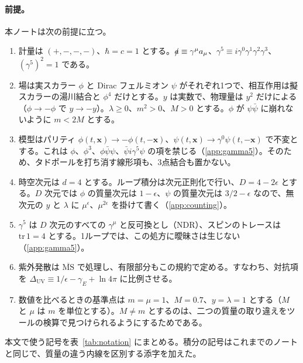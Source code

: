 \documentclass[a4paper,10pt]{ltjsarticle}
\newcommand{\MSbar}{\overline{\mathrm{MS}}}
\begin{document}
\paragraph{前提。}本ノートは次の前提に立つ。
\begin{enumerate}
\item 計量は $(+,-,-,-)$、$\hbar=c=1$ とする。$\slashed a\equiv\gamma^\mu a_\mu$、$\gamma^5\equiv i\gamma^0\gamma^1\gamma^2\gamma^3$、$(\gamma^5)^2=1$ である。
\item 場は実スカラー $\phi$ と Dirac フェルミオン $\psi$ がそれぞれ1つで、相互作用は擬スカラーの湯川結合と $\phi^4$ だけとする。$y$ は実数で、物理量は $y^2$ だけによる（$\phi\to-\phi$ で $y\to-y$）。$\lambda\ge0$、$m^2>0$、$M>0$ とする。$\phi$ が $\psi\bar\psi$ に崩れないように $m<2M$ とする。
\item 模型はパリティ $\phi(t,\boldsymbol x)\to-\phi(t,-\boldsymbol x)$、$\psi(t,\boldsymbol x)\to\gamma^0\psi(t,-\boldsymbol x)$ で不変とする。これは $\phi$、$\phi^3$、$\phi\bar\psi\psi$、$\bar\psi i\gamma^5\psi$ の項を禁じる（\ref{app:gamma5}）。そのため、タドポールを打ち消す線形項も、3点結合も置かない。
\item 時空次元は $d=4$ とする。ループ積分は次元正則化で行い、$D=4-2\epsilon$ とする。$D$ 次元では $\phi$ の質量次元は $1-\epsilon$、$\psi$ の質量次元は $3/2-\epsilon$ なので、無次元の $y$ と $\lambda$ に $\mu^\epsilon$、$\mu^{2\epsilon}$ を掛けて書く（\ref{app:counting}）。
\item $\gamma^5$ は $D$ 次元のすべての $\gamma^\mu$ と反可換とし（NDR）、スピンのトレースは $\mathrm{tr}\,1=4$ とする。1ループでは、この処方に曖昧さは生じない（\ref{app:gamma5}）。
\item 紫外発散は $\MSbar$ で処理し、有限部分もこの規約で定める。すなわち、対抗項を $\Delta_{\mathrm{UV}}\equiv1/\epsilon-\gamma_E+\ln4\pi$ に比例させる。
\item 数値を比べるときの基準点は $m=\mu=1$、$M=0.7$、$y=\lambda=1$ とする（$M$ と $\mu$ は $m$ を単位とする）。$M\ne m$ とするのは、二つの質量の取り違えをツールの検算で見つけられるようにするためである。
\end{enumerate}
本文で使う記号を表~\ref{tab:notation} にまとめる。積分の記号はこれまでのノートと同じで、質量の違う内線を区別する添字を加えた。
\end{document}
